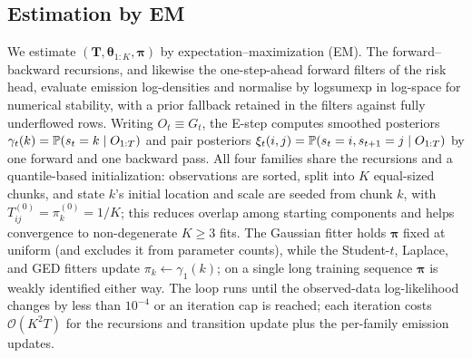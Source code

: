 \subsection{Estimation by EM}
\label{sec:estimation}

We estimate $(\mathbf{T}, \boldsymbol\theta_{1:K}, \boldsymbol\pi)$ by expectation--maximization (EM). The forward--backward recursions, and likewise the one-step-ahead forward filters of the risk head, evaluate emission log-densities and normalise by logsumexp in log-space for numerical stability, with a prior fallback retained in the filters against fully underflowed rows. Writing $O_t \equiv G_t$, the E-step computes smoothed posteriors $\gamma_t(k) = \mathbb{P}(s_t = k \mid O_{1:T})$ and pair posteriors $\xi_t(i,j) = \mathbb{P}(s_t = i, s_{t+1} = j \mid O_{1:T})$ by one forward and one backward pass. All four families share the recursions and a quantile-based initialization: observations are sorted, split into $K$ equal-sized chunks, and state $k$'s initial location and scale are seeded from chunk $k$, with $T_{ij}^{(0)} = \pi_k^{(0)} = 1/K$; this reduces overlap among starting components and helps convergence to non-degenerate $K \ge 3$ fits. The Gaussian fitter holds $\boldsymbol\pi$ fixed at uniform (and excludes it from parameter counts), while the Student-$t$, Laplace, and GED fitters update $\pi_k \leftarrow \gamma_1(k)$; on a single long training sequence $\boldsymbol\pi$ is weakly identified either way. The loop runs until the observed-data log-likelihood changes by less than $10^{-4}$ or an iteration cap is reached; each iteration costs $\mathcal{O}(K^2 T)$ for the recursions and transition update plus the per-family emission updates.

